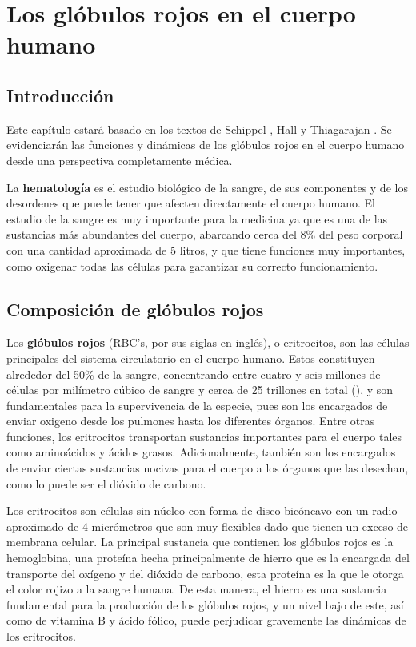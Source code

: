 \chapter{Los glóbulos rojos en el cuerpo humano}\label{chap:RBC}
\section{Introducción}\label{sec:RBC:intro}
Este capítulo estará basado en los textos de Schippel \cite{schippel2023dynamics}, Hall \cite{hall2021guyton} y Thiagarajan \cite{thiagarajan2021red}. Se evidenciarán las funciones y dinámicas de los glóbulos rojos en el cuerpo humano desde una perspectiva completamente médica.

La \textbf{hematología} es el estudio biológico de la sangre, de sus componentes y de los desordenes que puede tener que afecten directamente el cuerpo humano. El estudio de la sangre es muy importante para la medicina ya que es una de las sustancias más abundantes del cuerpo, abarcando cerca del 8\% del peso corporal con una cantidad aproximada de 5 litros, y que tiene funciones muy importantes, como oxigenar todas las células para garantizar su correcto funcionamiento.

\section{Composición de glóbulos rojos}\label{sec:RBC:Composicion}
Los \textbf{glóbulos rojos} (RBC's, por sus siglas en inglés), o eritrocitos, son las células principales del sistema circulatorio en el cuerpo humano. Estos constituyen alrededor del 50\% de la sangre, concentrando entre cuatro y seis millones de células por milímetro cúbico de sangre y cerca de 25 trillones en total (\cite{enwiki:1217153817}), y son fundamentales para la supervivencia de la especie, pues son los encargados de enviar oxigeno desde los pulmones hasta los diferentes órganos. Entre otras funciones, los eritrocitos transportan sustancias importantes para el cuerpo tales como aminoácidos y ácidos grasos. Adicionalmente, también son los encargados de enviar ciertas sustancias nocivas para el cuerpo a los órganos que las desechan, como lo puede ser el dióxido de carbono.

Los eritrocitos son células sin núcleo con forma de disco bicóncavo con un radio aproximado de 4 micrómetros que son muy flexibles dado que tienen un exceso de membrana celular. La principal sustancia que contienen los glóbulos rojos es la hemoglobina, una proteína hecha principalmente de hierro que es la encargada del transporte del oxígeno y del dióxido de carbono, esta proteína es la que le otorga el color rojizo a la sangre humana. De esta manera, el hierro es una sustancia fundamental para la producción de los glóbulos rojos, y un nivel bajo de este, así como de vitamina B y ácido fólico, puede perjudicar gravemente las dinámicas de los eritrocitos.

